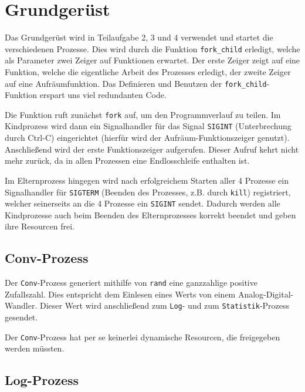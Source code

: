 \documentclass[12pt, a4paper]{scrartcl}
\begin{document}
\pagestyle{fancy}
\lhead{}
\newcommand{\np}{\bigskip\noindent}

\setlength{\parindent}{0pt}

\section{Grundgerüst}

Das Grundgerüst wird in Teilaufgabe 2, 3 und 4 verwendet und startet die
verschiedenen Prozesse. Dies wird durch die Funktion \texttt{fork\_child}
erledigt, welche als Parameter zwei Zeiger auf Funktionen erwartet. Der erste
Zeiger zeigt auf eine Funktion, welche die eigentliche Arbeit des Prozesses
erledigt, der zweite Zeiger auf eine Aufräumfunktion. Das Definieren und
Benutzen der \texttt{fork\_child}-Funktion erspart uns viel redundanten Code.
\np

Die Funktion ruft zunächst \texttt{fork} auf, um den Programmverlauf zu
teilen. Im Kindprozess wird dann ein Signalhandler für das Signal
\texttt{SIGINT} (Unterbrechung durch Ctrl-C) eingerichtet (hierfür wird der
Aufräum-Funktionszeiger genutzt). An\-schließ\-end wird der erste Funktionszeiger
aufgerufen. Dieser Aufruf kehrt nicht mehr zu\-rück, da in allen Prozessen eine
Endlosschleife enthalten ist.
\np

Im Elternprozess hingegen wird nach erfolgreichem Starten aller 4 Prozesse ein
Signalhandler für \texttt{SIGTERM} (Beenden des Prozesses, z.B. durch
\texttt{kill}) registriert, welcher seinerseits an die 4 Prozesse ein
\texttt{SIGINT} sendet. Dadurch werden alle Kindprozesse auch beim Beenden des
Elternprozesses korrekt beendet und geben ihre Resourcen frei.

\subsection{Conv-Prozess}

Der \texttt{Conv}-Prozess generiert mithilfe von \texttt{rand} eine
ganzzahlige positive Zufallszahl. Dies entspricht dem Einlesen eines Werts von
einem Analog-Digital-Wandler. Dieser Wert wird anschließend zum \texttt{Log}-
und zum \texttt{Statistik}-Prozess gesendet.
\np

Der \texttt{Conv}-Prozess hat per se keinerlei dynamische Resourcen, die
freigegeben werden müssten.

\subsection{Log-Prozess}
\end{document}
